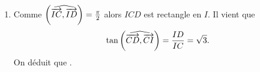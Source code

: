 \begin{description}
\begin{description}
\begin{enumerate}
\begin{enumerate}
										Comme
										$\begin{multiform} f(I) = I \\ f(C) = D \end{multiform}$, alors
										$\Angl{IC}{ID} = \frac{\pi}{2}$ est \'egal \`a l'angle de $f$
										et $ID = k\, IC$ o\`u $k$ est le rapport de $f$.
										Ainsi,
                        \item {}
                              Comme $\Angl{IC}{ID} = \frac{\pi}{2}$ alors 
                              $ICD$ est rectangle en $I$.
                              Il vient que 
                              $$\tan \left( \widehat{ \overrightarrow{CD} , \overrightarrow{CI} } \right) = \frac{ID}{IC} = \sqrt{3}.$$
                              On d\'eduit que 
                              .
                                    

\end{enumerate}
\end{enumerate}
\end{description}
\end{description}
